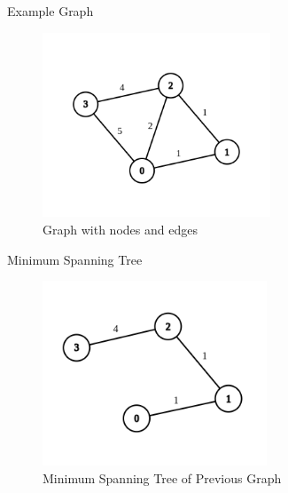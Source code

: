 \documentclass[10pt, aspectratio=169]{beamer}
\begin{document}
\begin{frame}{Example Graph}
    \begin{center}
        \begin{figure}
            \centering
            \includegraphics[height=5.5cm, keepaspectratio]{images/graph.png}
            \caption{Graph with nodes and edges \cite{graphs}}
        \end{figure}
    \end{center}
\end{frame}

\begin{frame}{Minimum Spanning Tree}
    \begin{center}
        \begin{figure}
            \centering
            \includegraphics[height=5.5cm, keepaspectratio]{images/mst.png}
            \caption{Minimum Spanning Tree of Previous Graph \cite{graphs}}
        \end{figure}
    \end{center}
\end{frame}
\end{document}
